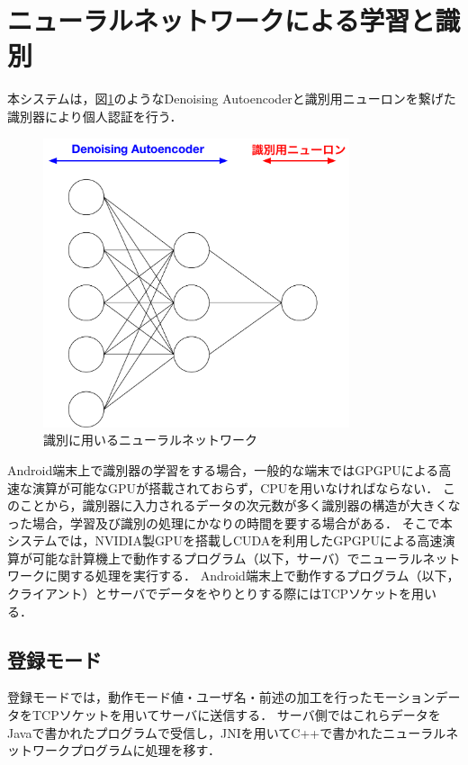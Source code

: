 \section{ニューラルネットワークによる学習と識別}
本システムは，図\ref{system-nn}のようなDenoising Autoencoderと識別用ニューロンを繋げた識別器により個人認証を行う．

\begin{figure}[bthp]
  \centering
  \includegraphics[bb=0 0 622 587, width=9cm]{Figures/system-nn.pdf}
  \caption{識別に用いるニューラルネットワーク}
  \label{system-nn}
\end{figure}

Android端末上で識別器の学習をする場合，一般的な端末ではGPGPUによる高速な演算が可能なGPUが搭載されておらず，CPUを用いなければならない．
このことから，識別器に入力されるデータの次元数が多く識別器の構造が大きくなった場合，学習及び識別の処理にかなりの時間を要する場合がある．
そこで本システムでは，NVIDIA製GPUを搭載しCUDA\cite{4-cuda}を利用したGPGPUによる高速演算が可能な計算機上で動作するプログラム（以下，サーバ）でニューラルネットワークに関する処理を実行する．
Android端末上で動作するプログラム（以下，クライアント）とサーバでデータをやりとりする際にはTCPソケットを用いる．

\subsection{登録モード}
登録モードでは，動作モード値・ユーザ名・前述の加工を行ったモーションデータをTCPソケットを用いてサーバに送信する．
サーバ側ではこれらデータをJavaで書かれたプログラムで受信し，JNI\cite{4-jni}を用いてC++で書かれたニューラルネットワークプログラムに処理を移す．


